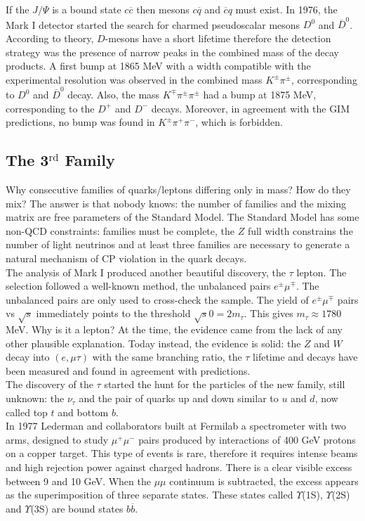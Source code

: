 \documentclass[10.75pt,a4paper,openright,bottom=2cm]{article}
\begin{document}
If the $J/\Psi$ is a bound state $c\overline{c}$ then mesons $c\overline{q}$ and $\overline{c}q$ must exist. In 1976, the Mark I detector started the search for charmed pseudoscalar mesons $D^0$ and $\overline{D}^0$. According to theory, $D$-mesons have a short lifetime therefore the detection strategy was the presence of narrow peaks in the combined mass of the decay products. A first bump at 1865 MeV with a width compatible with the experimental resolution was observed in the combined mass $K^\pm\pi^\pm$, corresponding to $D^0$ and $\overline{D}^0$ decay. Also, the mass $K^\mp\pi^\pm\pi^\pm$ had a bump at 1875 MeV, corresponding to the $D^+$ and $D^-$ decays. Moreover, in agreement with the GIM predictions, no bump was found in $K^\pm\pi^+\pi^-$, which is forbidden.
\subsection{The 3$^{\text{rd}}$ Family}
Why consecutive families of quarks/leptons differing only in mass? How do they mix? The answer is that nobody knows: the number of families and the mixing matrix are free parameters of the Standard Model. The Standard Model has some non-QCD constraints: families must be complete, the $Z$ full width constrains the number of light neutrinos and at least three families are necessary to generate a natural mechanism of CP violation in the quark decays.\\
The analysis of Mark I produced another beautiful discovery, the $\tau$ lepton. The selection followed a well-known method, the unbalanced pairs $e^\pm\mu^\mp$. The unbalanced pairs are only used to cross-check the sample. The yield of $e^\pm\mu^\mp$ pairs vs $\sqrt{s}$ immediately points to the threshold $\sqrt{s}0=2m_\tau$. This gives $m_\tau\approx1780$\;MeV. Why is it a lepton? At the time, the evidence came from the lack of any other plausible explanation. Today instead, the evidence is solid: the $Z$ and $W$ decay into $(e,\mu\tau)$ with the same branching ratio, the $\tau$ lifetime and decays have been measured and found in agreement with predictions.\\
The discovery of the $\tau$ started the hunt for the particles of the new family, still unknown: the $\nu_\tau$ and the pair of quarks up and down similar to $u$ and $d$, now called top $t$ and bottom $b$.\\
In 1977 Lederman and collaborators built at Fermilab a spectrometer with two arms, designed to study $\mu^+\mu^-$ pairs produced by interactions of 400 GeV protons on a copper target. This type of events is rare, therefore it requires intense beams and high rejection power against charged hadrons. There is a clear visible excess between 9 and 10 GeV. When the $\mu\mu$ continuum is subtracted, the excess appears as the superimposition of three separate states. These states called $\Upsilon$(1S), $\Upsilon$(2S) and $\Upsilon$(3S) are bound states $b\overline{b}$.\\
\end{document}
